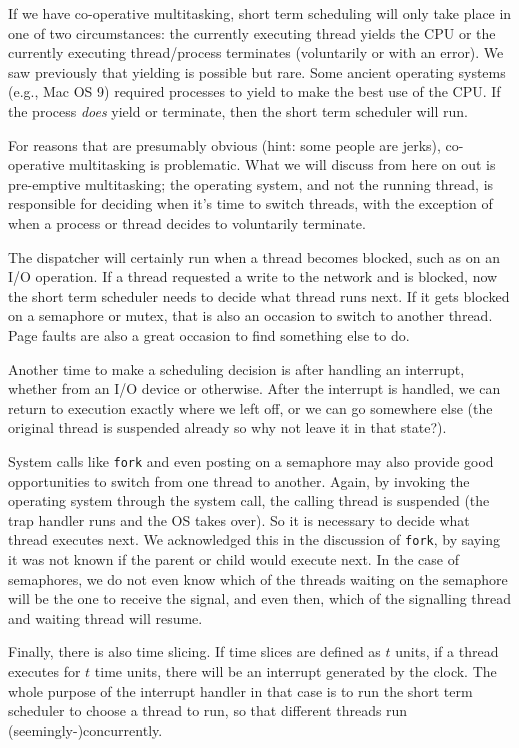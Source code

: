 If we have co-operative multitasking, short term scheduling will only take place in one of two circumstances: the currently executing thread yields the CPU or the currently executing thread/process terminates (voluntarily or with an error). We saw previously that yielding is possible but rare. Some ancient operating systems (e.g., Mac OS 9) required processes to yield to make the best use of the CPU. If the process \textit{does} yield or terminate, then the short term scheduler will run.

For reasons that are presumably obvious (hint: some people are jerks), co-operative multitasking is problematic. What we will discuss from here on out is pre-emptive multitasking; the operating system, and not the running thread, is responsible for deciding when it's time to switch threads, with the exception of when a process or thread decides to voluntarily terminate.

The dispatcher will certainly run when a thread becomes blocked, such as on an I/O operation. If a thread requested a write to the network and is blocked, now the short term scheduler needs to decide what thread runs next. If it gets blocked on a semaphore or mutex, that is also an occasion to switch to another thread. Page faults are also a great occasion to find something else to do.

Another time to make a scheduling decision is after handling an interrupt, whether from an I/O device or otherwise. After the interrupt is handled, we can return to execution exactly where we left off, or we can go somewhere else (the original thread is suspended already so why not leave it in that state?). 

System calls like \texttt{fork} and even posting on a semaphore may also provide good opportunities to switch from one thread to another. Again, by invoking the operating system through the system call, the calling thread is suspended (the trap handler runs and the OS takes over). So it is necessary to decide what thread executes next. We acknowledged this in the discussion of \texttt{fork}, by saying it was not known if the parent or child would execute next. In the case of semaphores, we do not even know which of the threads waiting on the semaphore will be the one to receive the signal, and even then, which of the signalling thread and waiting thread will resume.

Finally, there is also time slicing. If time slices are defined as $t$ units, if a thread executes for $t$ time units, there will be an interrupt generated by the clock. The whole purpose of the interrupt handler in that case is to run the short term scheduler to choose a thread to run, so that different threads run (seemingly-)concurrently.

